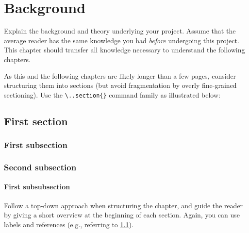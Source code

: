 \chapter{Background}
\label{ch:background}

{\color{red}
	Explain the background and theory underlying your project.
	Assume that the average reader has the same knowledge you had \emph{before} undergoing this project.
	This chapter should transfer all knowledge necessary to understand the following chapters.

	As this and the following chapters are likely longer than a few pages, consider structuring them into sections (but avoid fragmentation by overly fine-grained sectioning).
	Use the \verb|\..section{}| command family as illustrated below:

	\section{First section}
	\label{sec:background_overview}

	\subsection{First subsection}

	\subsection{Second subsection}

	\subsubsection{First subsubsection}

	Follow a top-down approach when structuring the chapter, and guide the reader by giving a short overview at the beginning of each section.
	Again, you can use labels and references (e.g., referring to \cref{sec:background_overview}).
}
